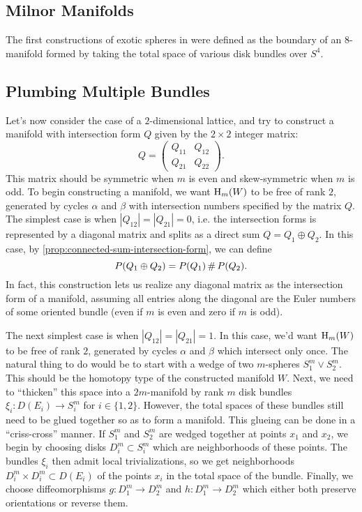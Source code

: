 \subsection{Milnor Manifolds}

The first constructions of exotic spheres in \cite{milnor1956manifolds} were defined as the boundary of an $8$-manifold formed by taking the total space of various disk bundles over $S^4$.


\begin{definition}
\end{definition}

\subsection{Plumbing Multiple Bundles}

Let's now consider the case of a $2$-dimensional lattice, and try to construct a manifold with intersection form $Q$ given by the $2\times 2$ integer matrix:
\[
	Q = \begin{pmatrix} Q_{11} & Q_{12} \\ Q_{21} & Q_{22}\end{pmatrix}.
\]
This matrix should be symmetric when $m$ is even and skew-symmetric when $m$ is odd. To begin constructing a manifold, we want $\operatorname{H}_m(W)$ to be free of rank $2$, generated by cycles $\alpha$ and $\beta$ with intersection numbers specified by the matrix $Q$. The simplest case is when $|Q_{12}|=|Q_{21}|=0$, i.e. the intersection forms is represented by a diagonal matrix and splits as a direct sum $Q=Q_1\oplus Q_2$. In this case, by \cref{prop:connected-sum-intersection-form}, we can define
\[
	P(Q_1\oplus Q_2) = P(Q_1)\,\#\, P(Q_2).
\]
In fact, this construction lets us realize any diagonal matrix as the intersection form of a manifold, assuming all entries along the diagonal are the Euler numbers of some oriented bundle (even if $m$ is even and zero if $m$ is odd).

The next simplest case is when $|Q_{12}|=|Q_{21}|=1$. In this case, we'd want $\operatorname{H}_m(W)$ to be free of rank $2$, generated by cycles $\alpha$ and $\beta$ which intersect only once. The natural thing to do would be to start with a wedge of two $m$-spheres $S^m_1\vee S^m_2$. This should be the homotopy type of the constructed manifold $W$. Next, we need to ``thicken'' this space into a $2m$-manifold by rank $m$ disk bundles $\xi_i : D(E_i) \to S^m_i$ for $i\in\{1,2\}$. However, the total spaces of these bundles still need to be glued together so as to form a manifold. This glueing can be done in a ``criss-cross'' manner. If $S^m_1$ and $S^m_2$ are wedged together at points $x_1$ and $x_2$, we begin by choosing disks $D_i^m\subset S^m_i$ which are neighborhoods of these points. The bundles $\xi_i$ then admit local trivializations, so we get neighborhoods $D_i^m\times D^m_i \subset D(E_i)$ of the points $x_i$ in the total space of the bundle. Finally, we choose diffeomorphisms $g : D_1^m \to D_2^m$ and $h : D_1^m \to D_2^m$ which either both preserve orientations or reverse them. 

